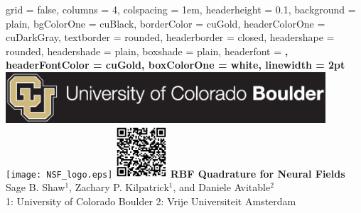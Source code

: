 \documentclass[paperwidth=40in,paperheight=32in,landscape]{baposter} %
\newcommand{\logosize}{0.75in}
\begin{document}

\begin{poster}{
	grid = false, %
	columns = 4, %
	colspacing = 1em,
	headerheight = 0.1\textheight,
	background = plain,
	bgColorOne = cuBlack,
	borderColor = cuGold,
	headerColorOne = cuDarkGray,
	textborder = rounded,
	headerborder = closed,
	headershape = rounded,
	headershade = plain,
	boxshade = plain,
	headerfont = \Large\sf\bf,
	headerFontColor = cuGold,
	boxColorOne = white,
	linewidth = 2pt
}
{
\includegraphics[height=\logosize, trim={0.5cm, 1cm, 16.4cm, 0.7cm}, clip=true]{cu_logo}
\hspace{.3cm}
\texttt{[image: NSF\_logo.eps]}
\hspace{.3cm}
\includegraphics[height=\logosize]{qrcode.png}
\hspace{.3cm}
}
{\sf\bf
	\color{cuGold}
	RBF Quadrature for Neural Fields
}
{
	\color{cuGold}
	Sage B. Shaw$^{1}$, Zachary P. Kilpatrick$^1$, and Daniele Avitable$^2$\\
	\small{1: University of Colorado Boulder}
	\small{2: Vrije Universiteit Amsterdam}
}
{
}
\end{poster}
\end{document}
